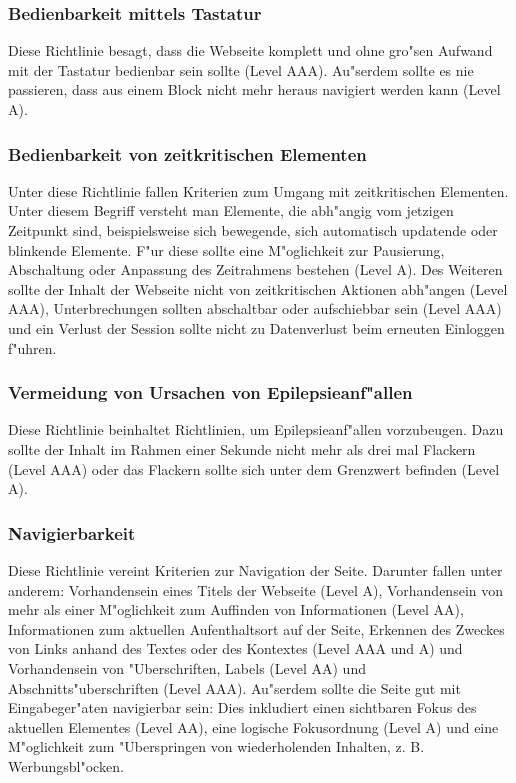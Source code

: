 \documentclass[a4paper,bibtotoc,oneside]{scrbook}
\begin{document}
\subsubsection{Bedienbarkeit mittels Tastatur}
Diese Richtlinie besagt, dass die Webseite komplett und ohne gro"sen Aufwand mit der Tastatur bedienbar sein sollte (Level AAA). Au"serdem sollte es nie passieren, dass aus einem Block nicht mehr heraus navigiert werden kann (Level A). \cite[Abschnitt 2.1]{wcag2}

\subsubsection{Bedienbarkeit von zeitkritischen Elementen}
Unter diese Richtlinie fallen Kriterien zum Umgang mit zeitkritischen Elementen. Unter diesem Begriff versteht man Elemente, die abh"angig vom jetzigen Zeitpunkt sind, beispielsweise sich bewegende, sich automatisch updatende oder blinkende Elemente. F"ur diese sollte eine M"oglichkeit zur Pausierung, Abschaltung oder Anpassung des Zeitrahmens bestehen (Level A). Des Weiteren sollte der Inhalt der Webseite nicht von zeitkritischen Aktionen abh"angen (Level AAA), Unterbrechungen sollten abschaltbar oder aufschiebbar sein (Level AAA) und ein Verlust der Session sollte nicht zu Datenverlust beim erneuten Einloggen f"uhren. \cite[Abschnitt 2.2]{wcag2}

\subsubsection{Vermeidung von Ursachen von Epilepsieanf"allen}
Diese Richtlinie beinhaltet Richtlinien, um Epilepsieanf"allen vorzubeugen. Dazu sollte der Inhalt im Rahmen einer Sekunde nicht mehr als drei mal Flackern (Level AAA) oder das Flackern sollte sich unter dem Grenzwert befinden (Level A). \cite[Abschnitt 2.3]{wcag2}

\subsubsection{Navigierbarkeit}
Diese Richtlinie vereint Kriterien zur Navigation der Seite. Darunter fallen unter anderem: Vorhandensein eines Titels der Webseite (Level A), Vorhandensein von mehr als einer M"oglichkeit zum Auffinden von Informationen (Level AA), Informationen zum aktuellen Aufenthaltsort auf der Seite, Erkennen des Zweckes von Links anhand des Textes oder des Kontextes (Level AAA und A) und Vorhandensein von "Uberschriften, Labels (Level AA) und Abschnitts"uberschriften (Level AAA). Au"serdem sollte die Seite gut mit Eingabeger"aten navigierbar sein: Dies inkludiert einen sichtbaren Fokus des aktuellen Elementes (Level AA), eine logische Fokusordnung (Level A) und eine M"oglichkeit zum "Uberspringen von wiederholenden Inhalten, z. B. Werbungsbl"ocken. \cite[Abschnitt 2.4]{wcag2}
\end{document}
